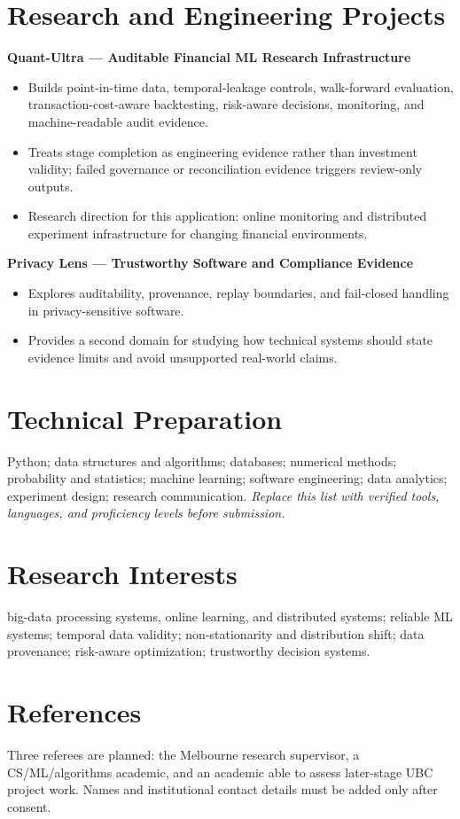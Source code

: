 \documentclass[11pt]{article}
\begin{document}
\section*{Research and Engineering Projects}
\textbf{Quant-Ultra --- Auditable Financial ML Research Infrastructure}
\begin{itemize}
\item Builds point-in-time data, temporal-leakage controls, walk-forward evaluation, transaction-cost-aware backtesting, risk-aware decisions, monitoring, and machine-readable audit evidence.
\item Treats stage completion as engineering evidence rather than investment validity; failed governance or reconciliation evidence triggers review-only outputs.
\item Research direction for this application: online monitoring and distributed experiment infrastructure for changing financial environments.
\end{itemize}

\begin{samepage}
\textbf{Privacy Lens --- Trustworthy Software and Compliance Evidence}
\begin{itemize}
\item Explores auditability, provenance, replay boundaries, and fail-closed handling in privacy-sensitive software.
\item Provides a second domain for studying how technical systems should state evidence limits and avoid unsupported real-world claims.
\end{itemize}
\end{samepage}

\section*{Technical Preparation}
Python; data structures and algorithms; databases; numerical methods; probability and statistics; machine learning; software engineering; data analytics; experiment design; research communication. \textit{Replace this list with verified tools, languages, and proficiency levels before submission.}

\section*{Research Interests}
big-data processing systems, online learning, and distributed systems; reliable ML systems; temporal data validity; non-stationarity and distribution shift; data provenance; risk-aware optimization; trustworthy decision systems.

\section*{References}
Three referees are planned: the Melbourne research supervisor, a CS/ML/algorithms academic, and an academic able to assess later-stage UBC project work. Names and institutional contact details must be added only after consent.
\end{document}

